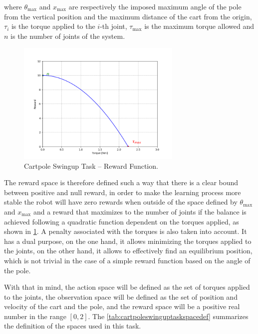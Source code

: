where $\theta_{\text{max}}$ and $x _{\text{max}}$ are respectively the imposed maximum angle of the pole from the vertical position and the maximum distance of the cart from the origin, $\tau _i$ is the torque applied to the $i$-th joint, $\tau _{\text{max}}$ is the maximum torque allowed and $n$ is the number of joints of the system.

\begin{figure}
    \centering
    \includegraphics[width=0.7\textwidth]{Images/cartpole_reward.png}
    \caption{Cartpole Swingup Task -- Reward Function.}
    \label{fig:cartpolereward}
\end{figure}

The reward space is therefore defined such a way that there is a clear bound between positive and null reward, in order to make the learning process more stable the robot will have zero rewards when outside of the space defined by $\theta_{\text{max}}$ and $x _{\text{max}}$ and a reward that maximizes to the number of joints if the balance is achieved following a quadratic function dependent on the torques applied, as shown in \cref{fig:cartpolereward}. A penalty associated with the torques is also taken into account. It has a dual purpose, on the one hand, it allows minimizing the torques applied to the joints, on the other hand, it allows to effectively find an equilibrium position, which is not trivial in the case of a simple reward function based on the angle of the pole.

With that in mind, the action space will be defined as the set of torques applied to the joints, the observation space will be defined as the set of position and velocity of the cart and the pole, and the reward space will be a positive real number in the range $[0,2]$. The \cref{tab:cartpoleswinguptaskspacedef} summarizes the definition of the spaces used in this task.

